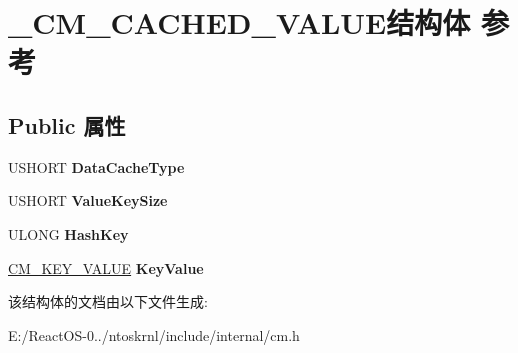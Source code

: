 \hypertarget{struct___c_m___c_a_c_h_e_d___v_a_l_u_e}{}\section{\+\_\+\+C\+M\+\_\+\+C\+A\+C\+H\+E\+D\+\_\+\+V\+A\+L\+U\+E结构体 参考}
\label{struct___c_m___c_a_c_h_e_d___v_a_l_u_e}
\subsection*{Public 属性}
\begin{DoxyCompactItemize}
\item 
\mbox{\label{struct___c_m___c_a_c_h_e_d___v_a_l_u_e_af117bf132e9d549e48928f8f8e155771}} 
U\+S\+H\+O\+RT {\bfseries Data\+Cache\+Type}
\item 
\mbox{\label{struct___c_m___c_a_c_h_e_d___v_a_l_u_e_a6c89cdf0bbbe90655832834d639a1eab}} 
U\+S\+H\+O\+RT {\bfseries Value\+Key\+Size}
\item 
\mbox{\label{struct___c_m___c_a_c_h_e_d___v_a_l_u_e_a22d0f45666d92c519b0b251236ca4f05}} 
U\+L\+O\+NG {\bfseries Hash\+Key}
\item 
\mbox{\label{struct___c_m___c_a_c_h_e_d___v_a_l_u_e_a6988de2908649b13ac9c6bced357b0ab}} 
\hyperlink{struct___c_m___k_e_y___v_a_l_u_e}{C\+M\+\_\+\+K\+E\+Y\+\_\+\+V\+A\+L\+UE} {\bfseries Key\+Value}
\end{DoxyCompactItemize}


该结构体的文档由以下文件生成\+:\begin{DoxyCompactItemize}
\item 
E\+:/\+React\+O\+S-\/0../ntoskrnl/include/internal/cm.\+h\end{DoxyCompactItemize}
